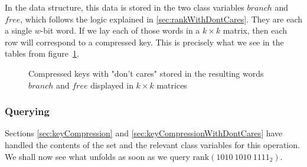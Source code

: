 In the data structure, this data is stored in the two class variables $branch$ and $free$, which follows the logic explained in \ref{sec:rankWithDontCares}. They are each a single $w$-bit word. If we lay each of those words in a $k \times k$ matrix, then each row will correspond to a compressed key. This is precisely what we see in the tables from figure~\ref{fig:branchAndFreeCompressedKeys}.%

\begin{figure}[H]
\centering

\caption[Example of how the compressed keys with "don't cares" are stored in the instance variables $branch$ and $free$]{Compressed keys with "don't cares" stored in the resulting words $branch$ and $free$ displayed in $k \times k$ matrices}
\label{fig:branchAndFreeCompressedKeys}
\end{figure}

% 

\subsubsection{Querying} \label{sec:rankDontCaresQuery}

Sections \ref{sec:keyCompression} and \ref{sec:keyCompressionWithDontCares} have handled the contents of the set and the relevant class variables for this operation. We shall now see what unfolds as soon as we query $\text{rank}(1010\ 1010\ 1111_2)$.

